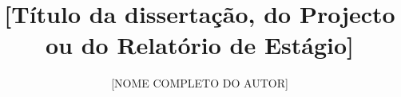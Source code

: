 \documentclass[msc,en,twoside,12pt,a4paper]{thesisisel}
\title{[Título da dissertação, do Projecto ou do Relatório de Estágio]}
\author[f]{\uppercase{[Nome completo do autor]}}
\begin{document}
\frontmatter

\printdedicatory
\printacknowledgements
\printabstract

\printnomenclature

\tableofcontents 

\printotherlists 

\printchapters
%
%
\nocite{*}

%
%
%
%
%
%

%
%
%
\end{document}
